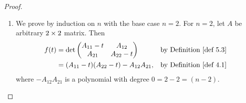 \begin{proof} \ 

\begin{enumerate}
\item We prove by induction on \(n\) with the base case \(n = 2\).
For \(n = 2\), let \(A\) be arbitrary \(2 \times 2\) matrix.
Then
\begin{align*}
    f(t) & = \det \begin{pmatrix}
        A_{11} - t & A_{12} \\
        A_{21}     & A_{22} - t
    \end{pmatrix} & \text{by \DEF{5.3}} \\
    & = (A_{11} - t)(A_{22} - t) - A_{12} A_{21}, & \text{by \DEF{4.1}}
\end{align*}
where \(-A_{12} A_{21}\) is a polynomial with degree \(0 = 2 - 2 = (n - 2)\).


\end{enumerate}
\end{proof}
